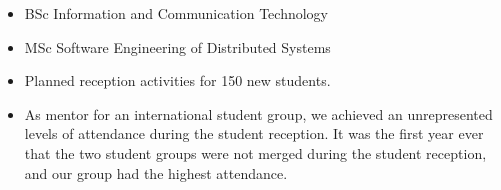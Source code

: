 \documentclass[10pt,a4paper]{altacv}
\begin{document}
\begin{itemize}
    \item BSc Information and Communication Technology
    \item MSc Software Engineering of Distributed Systems
\end{itemize}

\divider



\begin{itemize}
    \item Planned reception activities for 150 new students.
    \item As mentor for an international student group, we achieved an unrepresented levels of attendance during the student reception. It was the first year ever that the two student groups were not merged during the student reception, and our group had the highest attendance.
\end{itemize}

\divider



\end{document}
